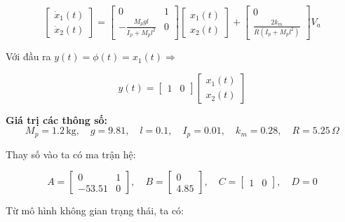         \begin{equation}
        \begin{bmatrix}
            \dot{x}_1(t) \\
            \dot{x}_2(t)
        \end{bmatrix}
        =
        \begin{bmatrix}
            0 & 1 \\
            -\frac{M_p g l}{I_p + M_p l^2} & 0
        \end{bmatrix}
        \begin{bmatrix}
            x_1(t) \\
            x_2(t)
        \end{bmatrix}
        +
        \begin{bmatrix}
            0 \\
            \frac{2k_m}{R (I_p + M_p l^2)}
        \end{bmatrix}
        V_a
        \end{equation}
        
        Với đầu ra \( y(t) = \phi(t) = x_1(t) \Rightarrow \)
        
        \[
        y(t) = \begin{bmatrix} 1 & 0 \end{bmatrix}
        \begin{bmatrix}
            x_1(t) \\
            x_2(t)
        \end{bmatrix}
        \]
        
        \textbf{Giá trị các thông số:}
        \[
            M_p = 1.2 \, \text{kg}, \quad g = 9.81, \quad l = 0.1, \quad I_p = 0.01, \quad k_m = 0.28, \quad R = 5.25 \, \Omega
        \]
        
        Thay số vào ta có ma trận hệ:
        
        \[
            A = \begin{bmatrix} 0 & 1 \\ -53.51 & 0 \end{bmatrix}, \quad
            B = \begin{bmatrix} 0 \\ 4.85 \end{bmatrix}, \quad
            C = \begin{bmatrix} 1 & 0 \end{bmatrix}, \quad
            D = 0
        \]
        
        Từ mô hình không gian trạng thái, ta có:
        
